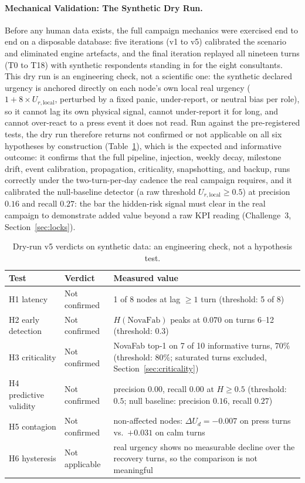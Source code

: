 \paragraph{Mechanical Validation: The Synthetic Dry Run.}
Before any human data exists, the full campaign mechanics were exercised end to end on a disposable database: five iterations (v1 to v5) calibrated the scenario and eliminated engine artefacts, and the final iteration replayed all nineteen turns (T0 to T18) with synthetic respondents standing in for the eight consultants. This dry run is an engineering check, not a scientific one: the synthetic declared urgency is anchored directly on each node's own local real urgency ($1 + 8 \times U_{r,\text{local}}$, perturbed by a fixed panic, under-report, or neutral bias per role), so it cannot lag its own physical signal, cannot under-report it for long, and cannot over-react to a press event it does not read. Run against the pre-registered tests, the dry run therefore returns not confirmed or not applicable on all six hypotheses by construction (Table~\ref{tab:helios_dryrun}), which is the expected and informative outcome: it confirms that the full pipeline, injection, weekly decay, milestone drift, event calibration, propagation, criticality, snapshotting, and backup, runs correctly under the two-turn-per-day cadence the real campaign requires, and it calibrated the null-baseline detector (a raw threshold $U_{r,\text{local}} \ge 0.5$) at precision $0.16$ and recall $0.27$: the bar the hidden-risk signal must clear in the real campaign to demonstrate added value beyond a raw KPI reading (Challenge~3, Section~\ref{sec:locks}).

\begin{table}[H]
\centering
\caption{Dry-run v5 verdicts on synthetic data: an engineering check, not a hypothesis test.}
\label{tab:helios_dryrun}
\small
\begin{tabularx}{\linewidth}{>{\raggedright\arraybackslash}p{3.4cm} >{\raggedright\arraybackslash}p{2.4cm} X}
\toprule
\textbf{Test} & \textbf{Verdict} & \textbf{Measured value} \\
\midrule
H1 latency & Not confirmed & 1 of 8 nodes at lag $\ge 1$ turn (threshold: 5 of 8) \\
H2 early detection & Not confirmed & $H(\text{NovaFab})$ peaks at $0.070$ on turns 6--12 (threshold: $0.3$) \\
H3 criticality & Not confirmed & NovaFab top-1 on 7 of 10 informative turns, $70\%$ (threshold: $80\%$; saturated turns excluded, Section~\ref{sec:criticality}) \\
H4 predictive validity & Not confirmed & precision $0.00$, recall $0.00$ at $H \ge 0.5$ (threshold: $0.5$; null baseline: precision $0.16$, recall $0.27$) \\
H5 contagion & Not confirmed & non-affected nodes: $\Delta U_d = -0.007$ on press turns vs.\ $+0.031$ on calm turns \\
H6 hysteresis & Not applicable & real urgency shows no measurable decline over the recovery turns, so the comparison is not meaningful \\
\bottomrule
\end{tabularx}
\end{table}

